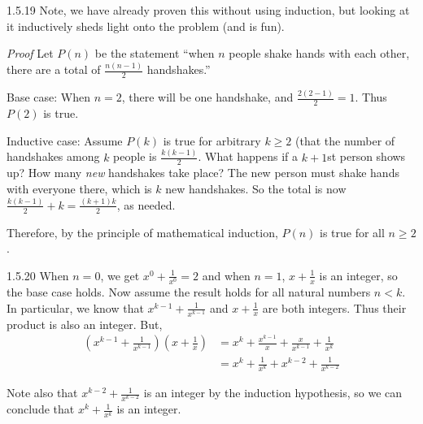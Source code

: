 \documentclass[11pt,]{book}
\makeatletter
\theoremstyle{ptxplainnotitle}
\theoremstyle{ptxplaintitle}
\renewcommand*{\proofname}{Proof}
\renewenvironment{proof}[1][\proofname]{\par
  \pushQED{\qed}%
  \normalfont \topsep6\p@\@plus6\p@\relax
  \trivlist
  \item\relax
    {\itshape
    #1\@addpunct{.}}\hspace\labelsep\ignorespaces
}{%
  \popQED\endtrivlist\@endpefalse
}
\theoremstyle{ptxdefinitionnotitle}
\theoremstyle{ptxdefinitiontitle}
\theoremstyle{ptxdefinitionnotitle}
\theoremstyle{ptxdefinitiontitle}
\theoremstyle{ptxdefinitionnotitle}
\theoremstyle{ptxdefinitiontitle}
\theoremstyle{ptxdefinitiontitlenonumber}
\theoremstyle{ptxdefinitiontitlenonumber}
\numberwithin{equation}{chapter}
\newcommand{\lt}{<}
\newcommand{\amp}{&}
\makeatother
\begin{document}
\begin{divisionexercise}{1.5.19}
\textbf{}\hypertarget{p-643}{}%
Note, we have already proven this without using induction, but looking at it inductively sheds light onto the problem (and is fun).%
\begin{proof}\hypertarget{proof-18}{}
\hypertarget{p-644}{}%
Let \(P(n)\) be the statement ``when \(n\) people shake hands with each other, there are a total of \(\frac{n(n-1)}{2}\) handshakes.''%
\par
\hypertarget{p-645}{}%
Base case: When \(n=2\), there will be one handshake, and \(\frac{2(2-1)}{2} = 1\).  Thus \(P(2)\) is true.%
\par
\hypertarget{p-646}{}%
Inductive case: Assume \(P(k)\) is true for arbitrary \(k\ge 2\) (that the number of handshakes among \(k\) people is \(\frac{k(k-1)}{2}\).  What happens if a \(k+1\)st person shows up?  How many \emph{new} handshakes take place?  The new person must shake hands with everyone there, which is \(k\) new  handshakes.  So the total is now \(\frac{k(k-1)}{2} + k = \frac{(k+1)k}{2}\), as needed.%
\par
\hypertarget{p-647}{}%
Therefore, by the principle of mathematical induction, \(P(n)\) is true for all \(n \ge 2\).%
\end{proof}
\end{divisionexercise}%
\begin{divisionexercise}{1.5.20}
\textbf{}\hypertarget{p-649}{}%
When \(n = 0\), we get \(x^0 +\frac{1}{x^0} = 2\) and when \(n = 1\), \(x + \frac{1}{x}\) is an integer, so the base case holds. Now assume the result holds for all natural numbers \(n \lt  k\). In particular, we know that \(x^{k-1} + \frac{1}{x^{k-1}}\) and \(x + \frac{1}{x}\) are both integers. Thus their product is also an integer. But,%
\begin{align*}
\left(x^{k-1} + \frac{1}{x^{k-1}}\right)\left(x + \frac{1}{x}\right) \amp = x^k + \frac{x^{k-1}}{x} + \frac{x}{x^{k-1}} + \frac{1}{x^k}\\
\amp = x^k + \frac{1}{x^k} + x^{k-2} + \frac{1}{x^{k-2}}
\end{align*}
%
\par
\hypertarget{p-650}{}%
Note also that \(x^{k-2} + \frac{1}{x^{k-2}}\) is an integer by the induction hypothesis, so we can conclude that \(x^k + \frac{1}{x^k}\) is an integer.%
\end{divisionexercise}%
\end{document}
